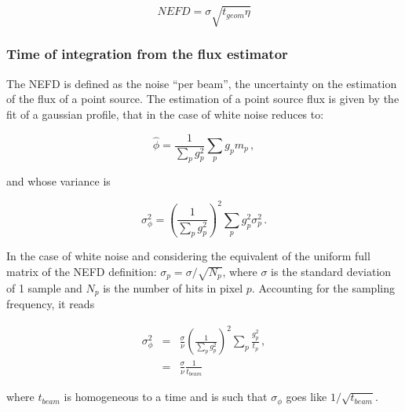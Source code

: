 \begin{equation}
NEFD = \sigma \sqrt{t_{geom}\eta}
\label{eq:nefd_t_geom}
\end{equation}


\subsubsection{Time of integration from the flux estimator}

The NEFD is defined as the noise ``per beam'', the uncertainty on the estimation
of the flux of a point source. The estimation of a point source flux is given by
the fit of a gaussian profile, that in the case of white noise reduces to:

\begin{equation}
\hat{\phi} = \frac{1}{\sum_p g_p^2}\sum_p g_p m_p\,,
\label{eq:phi_def}
\end{equation}

and whose variance is

\begin{equation}
\sigma_\phi^2 = \left(\frac{1}{\sum_p g_p^2}\right)^2\sum_p g_p^2\sigma_p^2\,.
\label{eq:sigma_phi_def}
\end{equation}

In the case of white noise and considering the equivalent of the
uniform full matrix of the NEFD definition: $\sigma_p = \sigma/\sqrt{N_p}$,
where $\sigma$ is the standard deviation of 1 sample and $N_p$ is the number of
hits in pixel $p$. Accounting for the sampling frequency, it reads

\begin{eqnarray}
\sigma_\phi^2 &=& \frac{\sigma}{\nu}\left(\frac{1}{\sum_p g_p^2}\right)^2\sum_p \frac{g_p^2}{t_p}\,, \nonumber\\
&=&\frac{\sigma}{\nu}\frac{1}{t_{beam}}\,
\label{eq:sigma_phi_def_2}
\end{eqnarray}

where $t_{beam}$ is homogeneous to a time and is such that $\sigma_\phi$ goes
like $1/\sqrt{t_{beam}}$.\\


